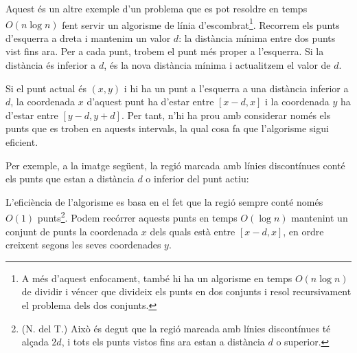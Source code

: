 Aquest és un altre exemple d'un problema que es pot resoldre en temps
$O(n \log n)$ fent servir un algorisme de línia d'escombrat\footnote{A
més d'aquest enfocament, també hi ha un algorisme en temps $O(n \log
n)$ de dividir i véncer \cite{sha75} que divideix els punts en dos
conjunts i resol recursivament el problema dels dos
conjunts.}. Recorrem els punts d'esquerra a dreta i mantenim un valor
$d$: la distància mínima entre dos punts vist fins ara. Per a cada punt,
trobem el punt més proper a l'esquerra. Si la distància és inferior a
$d$, és la nova distància mínima i actualitzem el valor de $d$.

Si el punt actual és $(x,y)$ i hi ha un punt a l'esquerra a una
distància inferior a $d$, la coordenada $x$ d'aquest punt ha d'estar
entre $[x-d,x]$ i la coordenada $y$ ha d'estar entre $[y-d,y+d]$. Per
tant, n'hi ha prou amb considerar només els punts que es troben en
aquests intervals, la qual cosa fa que l'algorisme sigui eficient.

Per exemple, a la imatge següent, la regió marcada amb línies
discontínues conté els punts que estan a distància $d$ o inferior del
punt actiu:

\begin{center}
\end{center}

L'eficiència de l'algorisme es basa en el fet que la regió sempre
conté només $O(1)$ punts\footnote{(N. del T.) Això és degut que la
regió marcada amb línies discontínues té alçada $2d$, i tots els punts
vistos fins ara estan a distància $d$ o superior.}. Podem recórrer
aquests punts en temps $O(\log n)$ mantenint un conjunt de punts la
coordenada $x$ dels quals està entre $[x-d,x]$, en ordre creixent
segons les seves coordenades $y$.

